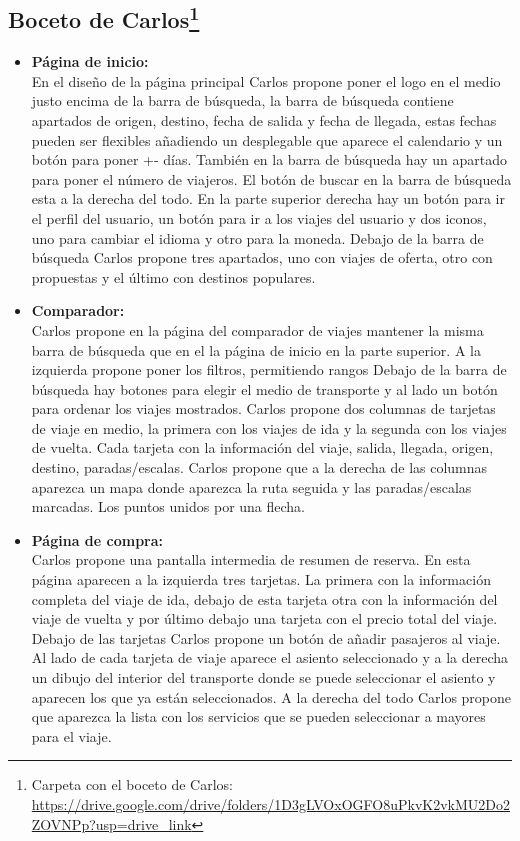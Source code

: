 \subsection[Boceto de Carlos]{Boceto de Carlos\footnote{Carpeta con el boceto de Carlos: \url{https://drive.google.com/drive/folders/1D3gLVOxOGFO8uPkvK2vkMU2Do2ZOVNPp?usp=drive_link}}}

\begin{itemize}
      \item\textbf{Página de inicio:} \\ En el diseño de la página principal Carlos propone poner el logo en el medio justo encima de la barra de búsqueda, la barra de búsqueda contiene apartados de origen, destino, fecha de salida y fecha de llegada, estas fechas pueden ser flexibles añadiendo un desplegable que aparece el calendario y un botón para poner +- días. También en la barra de búsqueda hay un apartado para poner el número de viajeros.
            El botón de buscar en la barra de búsqueda esta a la derecha del todo.
            En la parte superior derecha hay un botón para ir el perfil del usuario, un botón para ir a los viajes del usuario y dos iconos, uno para cambiar el idioma y otro para la moneda.
            Debajo de la barra de búsqueda Carlos propone tres apartados, uno con viajes de oferta, otro con propuestas y el último con destinos populares.

      \item\textbf{Comparador:} \\ Carlos propone en la página del comparador de viajes mantener la misma barra de búsqueda que en el la página de inicio en la parte superior.
            A la izquierda propone poner los filtros, permitiendo rangos
            Debajo de la barra de búsqueda hay botones para elegir el medio de transporte y al lado un botón para ordenar los viajes mostrados.
            Carlos propone dos columnas de tarjetas de viaje en medio, la primera con los viajes de ida y la segunda con los viajes de vuelta.
            Cada tarjeta con la información del viaje, salida, llegada, origen, destino, paradas/escalas.
            Carlos propone que a la derecha de las columnas aparezca un mapa donde aparezca la ruta seguida y las paradas/escalas marcadas. Los puntos unidos por una flecha.

      \item\textbf{Página de compra:} \\ Carlos propone una pantalla intermedia de resumen de reserva.
            En esta página aparecen a la izquierda tres tarjetas. La primera con la información completa del viaje de ida, debajo de esta tarjeta otra con la información del viaje de vuelta y por último debajo una tarjeta con el precio total del viaje.
            Debajo de las tarjetas Carlos propone un botón de añadir pasajeros al viaje.
            Al lado de cada tarjeta de viaje aparece el asiento seleccionado y a la derecha un dibujo del interior del transporte donde se puede seleccionar el asiento y aparecen los que ya están seleccionados.
            A la derecha del todo Carlos propone que aparezca la lista con los servicios que se pueden seleccionar a mayores para el viaje.


\end{itemize}
